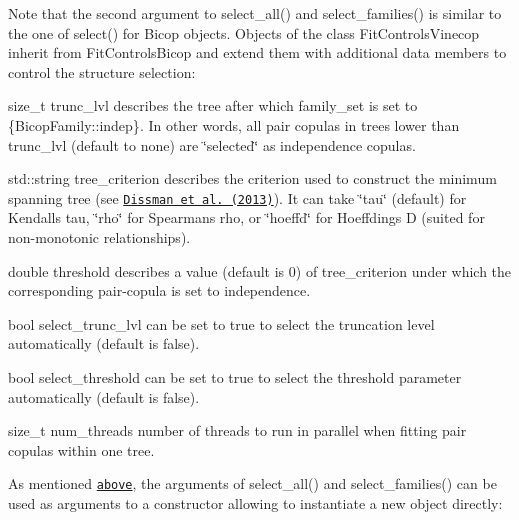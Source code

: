Note that the second argument to {\ttfamily select\+\_\+all()} and {\ttfamily select\+\_\+families()} is similar to the one of {\ttfamily select()} for {\ttfamily Bicop} objects. Objects of the class {\ttfamily Fit\+Controls\+Vinecop} inherit from {\ttfamily Fit\+Controls\+Bicop} and extend them with additional data members to control the structure selection\+:
\begin{DoxyItemize}
\item {\ttfamily size\+\_\+t trunc\+\_\+lvl} describes the tree after which {\ttfamily family\+\_\+set} is set to {\ttfamily \{Bicop\+Family\+::indep\}}. In other words, all pair copulas in trees lower than {\ttfamily trunc\+\_\+lvl} (default to none) are \char`\"{}selected\char`\"{} as independence copulas.
\item {\ttfamily std\+::string tree\+\_\+criterion} describes the criterion used to construct the minimum spanning tree (see \href{https://mediatum.ub.tum.de/doc/1079277/1079277.pdf}{\tt Dissman et al. (2013)}). It can take {\ttfamily \char`\"{}tau\char`\"{}} (default) for Kendall\textquotesingle{}s tau, {\ttfamily \char`\"{}rho\char`\"{}} for Spearman\textquotesingle{}s rho, or {\ttfamily \char`\"{}hoeffd\char`\"{}} for Hoeffding\textquotesingle{}s D (suited for non-\/monotonic relationships).
\item {\ttfamily double threshold} describes a value (default is 0) of {\ttfamily tree\+\_\+criterion} under which the corresponding pair-\/copula is set to independence.
\item {\ttfamily bool select\+\_\+trunc\+\_\+lvl} can be set to true to select the truncation level automatically (default is {\ttfamily false}).
\item {\ttfamily bool select\+\_\+threshold} can be set to true to select the threshold parameter automatically (default is {\ttfamily false}).
\item {\ttfamily size\+\_\+t num\+\_\+threads} number of threads to run in parallel when fitting pair copulas within one tree.
\end{DoxyItemize}

As mentioned \href{#set-up-a-custom-vine-copula-model}{\tt above}, the arguments of {\ttfamily select\+\_\+all()} and {\ttfamily select\+\_\+families()} can be used as arguments to a constructor allowing to instantiate a new object directly\+:


